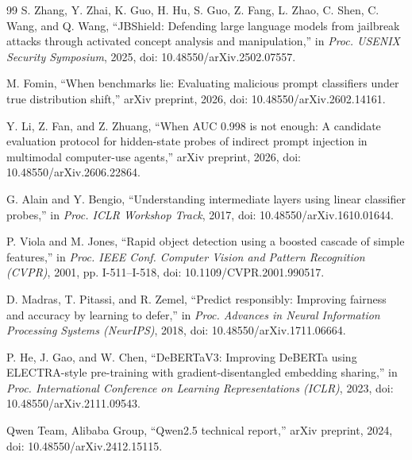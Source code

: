 \documentclass[conference]{IEEEtran}
\begin{document}
\begin{thebibliography}{99}
S. Zhang, Y. Zhai, K. Guo, H. Hu, S. Guo, Z. Fang, L. Zhao, C. Shen, C. Wang,
and Q. Wang, ``JBShield: Defending large language models from jailbreak attacks
through activated concept analysis and manipulation,'' in \emph{Proc. USENIX
Security Symposium}, 2025, doi: 10.48550/arXiv.2502.07557.

M. Fomin, ``When benchmarks lie: Evaluating malicious prompt classifiers under
true distribution shift,'' arXiv preprint, 2026,
doi: 10.48550/arXiv.2602.14161.

Y. Li, Z. Fan, and Z. Zhuang, ``When AUC 0.998 is not enough: A candidate
evaluation protocol for hidden-state probes of indirect prompt injection in
multimodal computer-use agents,'' arXiv preprint, 2026,
doi: 10.48550/arXiv.2606.22864.

G. Alain and Y. Bengio, ``Understanding intermediate layers using linear
classifier probes,'' in \emph{Proc. ICLR Workshop Track}, 2017,
doi: 10.48550/arXiv.1610.01644.

P. Viola and M. Jones, ``Rapid object detection using a boosted cascade of
simple features,'' in \emph{Proc. IEEE Conf. Computer Vision and Pattern
Recognition (CVPR)}, 2001, pp. I-511--I-518, doi: 10.1109/CVPR.2001.990517.

D. Madras, T. Pitassi, and R. Zemel, ``Predict responsibly: Improving fairness
and accuracy by learning to defer,'' in \emph{Proc. Advances in Neural
Information Processing Systems (NeurIPS)}, 2018,
doi: 10.48550/arXiv.1711.06664.

P. He, J. Gao, and W. Chen, ``DeBERTaV3: Improving DeBERTa using
ELECTRA-style pre-training with gradient-disentangled embedding sharing,'' in
\emph{Proc. International Conference on Learning Representations (ICLR)}, 2023,
doi: 10.48550/arXiv.2111.09543.

Qwen Team, Alibaba Group, ``Qwen2.5 technical report,'' arXiv preprint, 2024,
doi: 10.48550/arXiv.2412.15115.
\end{thebibliography}
\end{document}
